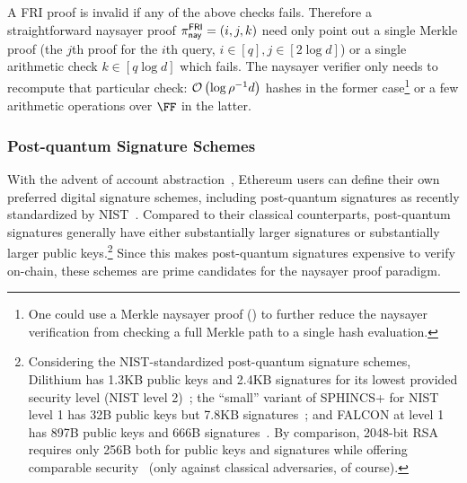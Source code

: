 A FRI proof is invalid if any of the above checks fails. Therefore a straightforward naysayer proof $\pi^{\mathsf{FRI}}_{\mathsf{nay}}=(i,j,k)$ need only point out a single Merkle proof (the $j$th proof for the $i$th query, $i\in[q], j \in [2\log{d}]$) or a single arithmetic check $k \in [q\log{d}]$ which fails. The naysayer verifier only needs to recompute that particular check: $\mathcal{O}\left(\log{\rho^{-1}d}\right)$ hashes in the former case\footnote{One could use a Merkle naysayer proof () to further reduce the naysayer verification from checking a full Merkle path to a single hash evaluation.} or a few arithmetic operations over $\FF$ in the latter.

\subsubsection{Post-quantum Signature Schemes}\label{sec:pqsig_naysayer}

With the advent of account abstraction~\cite{accountabstraction}, Ethereum users can define their own preferred digital signature schemes, including post-quantum signatures as recently standardized by NIST~\cite{CCS:BHKNRS19,TCHES:DKLLS18,NISTPQC:FALCON22}.
Compared to their classical counterparts, post-quantum signatures generally have either substantially larger signatures or substantially larger public keys.\footnote{Considering the NIST-standardized post-quantum signature schemes, Dilithium has 1.3KB public keys and 2.4KB signatures for its lowest provided security level (NIST level 2)~\cite{dilithium-spec}; the ``small'' variant of SPHINCS+ for NIST level 1 has 32B public keys but 7.8KB signatures~\cite{sphincsplus-spec}; and FALCON at level 1 has 897B public keys and 666B signatures~\cite{falcon-spec}. By comparison, 2048-bit RSA requires only 256B both for public keys and signatures while offering comparable security~\cite{keylength} (only against classical adversaries, of course).}
Since this makes post-quantum signatures expensive to verify on-chain, these schemes are prime candidates for the naysayer proof paradigm.

